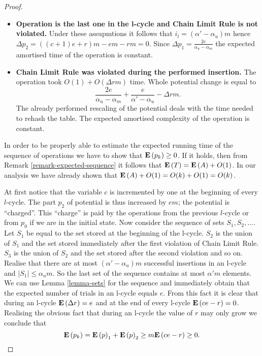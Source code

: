 \begin{proof}
\begin{itemize}
\item \textbf{Operation is the last one in the l-cycle and Chain Limit Rule is not violated.} Under these assupmtions it follows that $i_l = (\alpha' - \alpha_u)m$ hence $\Delta p_2 = ((c + 1)e + r)m - em - rm = 0$. Since $\Delta p_1 = \frac{2e}{\alpha_u - \alpha_m}$ the expected amortised time of the operation is constant.

\item \textbf{Chain Limit Rule was violated during the performed insertion.}
The operation took $O(1) + O(\Delta r m)$ time. Whole potential change is equal to \[ \frac{2e}{\alpha_u - \alpha_m} + \frac{e}{\alpha' - \alpha_u} - \Delta r m .\] The already performed rescaling of the potential deals with the time needed to rehash the table. The expected amortised complexity of the operation is constant.
\end{itemize}

In order to be properly able to estimate the expected running time of the sequence of operations we have to show that $\mathbf{E}\left(p_k\right) \geq 0$. If it holds, then from Remark \ref{remark-expected-sequence} it follows that $\mathbf{E}\left(T\right) = \mathbf{E}\left(A\right) + O(1)$. In our analysis we have already shown that $\mathbf{E}\left(A\right) + O(1) = O(k) + O(1) = O(k)$. 

At first notice that the variable $c$ is incremented by one at the beginning of every $l$-cycle. The part $p_2$ of potential is thus increased by $em$; the potential is ``charged''. This ``charge'' is paid by the operations from the previous $l$-cycle or from $p_0$ if we are in the initial state. Now consider the sequence of sets $S_1, S_2, \dots$. Let $S_1$ be equal to the set stored at the beginning of the l-cycle. $S_2$ is the union of $S_1$ and the set stored immediately after the first violation of Chain Limit Rule. $S_3$ is the union of $S_2$ and the set stored after the second violation and so on. Realise that there are at most $(\alpha' - \alpha_u)m$ successful insertions in an l-cycle and $|S_1| \leq \alpha_u m$. So the last set of the sequence contains at most $\alpha'm$ elements. We can use Lemma \ref{lemma-sets} for the sequence and immediately obtain that the expected number of trials in an l-cycle equals $e$. From this fact it is clear that during an l-cycle $\mathbf{E}\left(\Delta r\right) = e$ and at the end of every l-cycle $\mathbf{E}\left(ce - r\right) = 0$. Realising the obvious fact that during an l-cycle the value of $r$ may only grow we conclude that
\[
\mathbf{E}\left(p_k\right) = \mathbf{E}\left(p\right)_1 + \mathbf{E}\left(p\right)_2 \geq m\mathbf{E}\left(ce - r\right) \geq 0.
\]
\end{proof}

